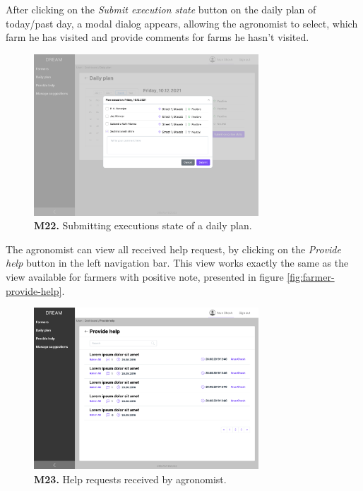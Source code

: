     After clicking on the \textit{Submit execution state} button on the daily plan of today/past day, a modal dialog appears, allowing the agronomist to select, which farm he has visited and provide comments for farms he hasn't visited.
    \begin{figure}[H]
        \centering
        \includegraphics[width=0.75\textwidth]{mockups/Agronomist_Dashboard_Visit plan_Submit.png}
        \caption{\textbf{M22.} Submitting executions state of a daily plan.}
    \end{figure}
    
    The agronomist can view all received help request, by clicking on the \textit{Provide help} button in the left navigation bar. This view works exactly the same as the view available for farmers with positive note, presented in figure \ref{fig:farmer-provide-help}.
    \begin{figure}[H]
        \centering
        \includegraphics[width=0.75\textwidth]{mockups/Agronomist_Dashboard_Provide help.png}
        \caption{\textbf{M23.} Help requests received by agronomist.}
    \end{figure}
    

